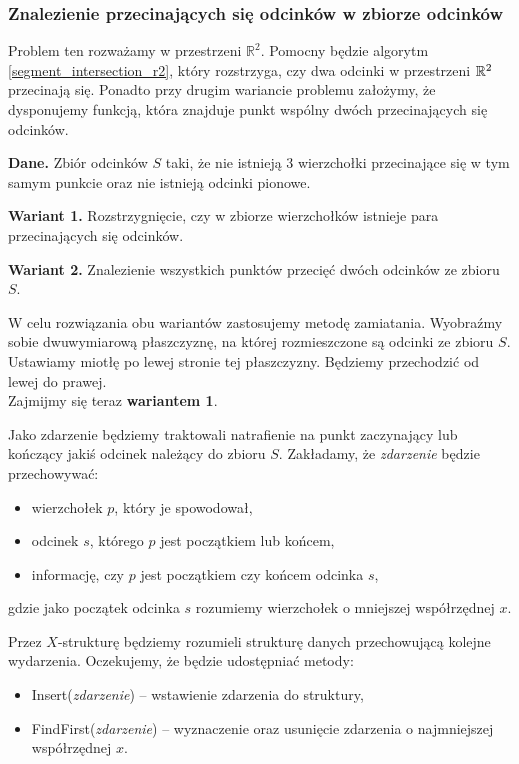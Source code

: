 \subsubsection{Znalezienie przecinających się odcinków w zbiorze odcinków}
Problem ten rozważamy w przestrzeni $\mathbb{R}^2$. Pomocny będzie 
algorytm \ref{segment_intersection_r2}, który rozstrzyga, czy dwa odcinki
w przestrzeni $\mathbb{R}^2$ przecinają się. Ponadto przy drugim wariancie problemu 
założymy, że dysponujemy funkcją, która znajduje punkt wspólny dwóch 
przecinających się odcinków. 

\textbf{Dane.} Zbiór odcinków $S$ taki, że nie istnieją 3 wierzchołki przecinające
się w tym samym punkcie oraz nie istnieją odcinki pionowe.

\textbf{Wariant 1.} Rozstrzygnięcie, czy w zbiorze wierzchołków istnieje 
para przecinających się odcinków.

\textbf{Wariant 2.} Znalezienie wszystkich punktów przecięć dwóch odcinków ze zbioru $S$.

W celu rozwiązania obu wariantów zastosujemy metodę zamiatania. Wyobraźmy
sobie dwuwymiarową płaszczyznę, na której rozmieszczone są odcinki ze zbioru $S$.
Ustawiamy miotłę po lewej stronie tej płaszczyzny. Będziemy przechodzić od lewej do prawej.
\\

Zajmijmy się teraz \textbf{wariantem 1}.

Jako zdarzenie będziemy traktowali natrafienie na punkt zaczynający 
lub kończący jakiś odcinek należący do zbioru $S$.
Zakładamy, że \textit{zdarzenie} będzie przechowywać:
\begin{itemize}
	\item wierzchołek $p$, który je spowodował, 
	\item odcinek $s$, którego $p$ jest początkiem lub końcem,
	\item informację, czy $p$ jest początkiem czy końcem odcinka $s$,
\end{itemize}
gdzie jako początek odcinka $s$ rozumiemy wierzchołek o mniejszej współrzędnej $x$.

Przez $X$-strukturę będziemy rozumieli strukturę danych przechowującą 
kolejne wydarzenia. Oczekujemy, że będzie udostępniać metody:
\begin{itemize}
	\item Insert(\textit{zdarzenie})  -- wstawienie zdarzenia do struktury,
	\item FindFirst(\textit{zdarzenie})  -- wyznaczenie oraz usunięcie zdarzenia
	o najmniejszej współrzędnej $x$.
\end{itemize}


